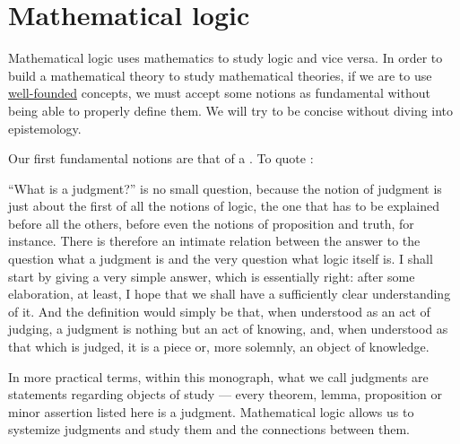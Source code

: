 \section{Mathematical logic}\label{sec:mathematical_logic}

Mathematical logic uses mathematics to study logic and vice versa. In order to build a mathematical theory to study mathematical theories, if we are to use \hyperref[def:well_founded_relation]{well-founded} concepts, we must accept some notions as fundamental without being able to properly define them. We will try to be concise without diving into epistemology.

\begin{concept}\label{con:judgement}
  Our first fundamental notions are that of a . To quote :
  \begin{displayquote}
    \enquote{What is a judgment?} is no small question, because the notion of judgment is just about the first of all the notions of logic, the one that has to be explained before all the others, before even the notions of proposition and truth, for instance. There is therefore an intimate relation between the answer to the question what a judgment is and the very question what logic itself is. I shall start by giving a very simple answer, which is essentially right: after some elaboration, at least, I hope that we shall have a sufficiently clear understanding of it. And the definition would simply be that, when understood as an act of judging, a judgment is nothing but an act of knowing, and, when understood as that which is judged, it is a piece or, more solemnly, an object of knowledge.
  \end{displayquote}
\end{concept}
\begin{comments}
  \item In more practical terms, within this monograph, what we call judgments are statements regarding objects of study --- every theorem, lemma, proposition or minor assertion listed here is a judgment. Mathematical logic allows us to systemize judgments and study them and the connections between them.
\end{comments}

